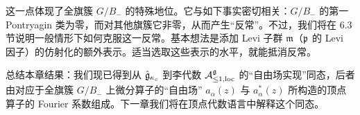 这一点体现了全旗簇 $G/B_-$ 的特殊地位。它与如下事实密切相关：$G/B_-$ 的第一 Pontryagin 类为零，而对其他旗簇它非零，从而产生“反常”。不过，我们将在 6.3 节说明一般情形下如何克服这一反常。基本想法是添加 Levi 子群 $\mathfrak{m}$（$\mathfrak{p}$ 的 Levi 因子）的仿射化的额外表示。适当选取这些表示的水平，就能抵消反常。


总结本章结果：我们现已得到从 $\hat{\mathfrak{g}}_{\kappa_c}$ 到李代数 $\mathcal{A}^{\mathfrak{g}}_{\le1,\mathrm{loc}}$ 的“自由场实现”同态，后者由对应于全旗簇 $G/B_-$ 上微分算子的“自由场” $a_\alpha(z)$ 与 $a^*_\alpha(z)$ 所构造的顶点算子的 Fourier 系数组成。下一章我们将在顶点代数语言中解释这个同态。
